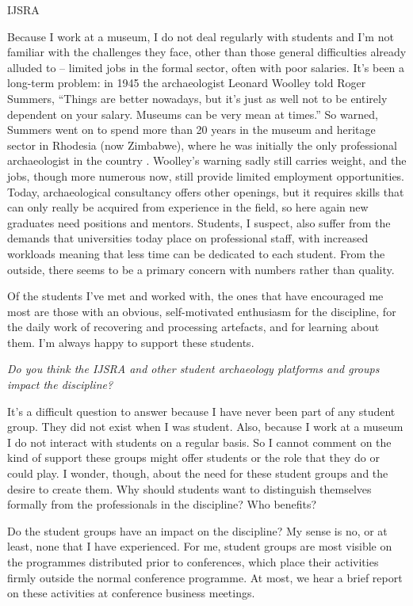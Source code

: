 \begin{labeling}{IJSRA}
\item[GW]
Because I work at a museum, I do not deal regularly with students and I’m not familiar with the challenges they face, other than those general difficulties already alluded to – limited jobs in the formal sector, often with poor salaries. It’s been a long-term problem: in 1945 the archaeologist Leonard Woolley told Roger Summers, “Things are better nowadays, but it’s just as well not to be entirely dependent on your salary. Museums can be very mean at times.” So warned, Summers went on to spend more than 20 years in the museum and heritage sector in Rhodesia (now Zimbabwe), where he was initially the only professional archaeologist in the country \parencite{Summers1995}. 
Woolley’s warning sadly still carries weight, and the jobs, though more numerous now, still provide limited employment opportunities. Today, archaeological consultancy offers other openings, but it requires skills that can only really be acquired from experience in the field, so here again new graduates need positions and mentors. Students, I suspect, also suffer from the demands that universities today place on professional staff, with increased workloads meaning that less time can be dedicated to each student. From the outside, there seems to be a primary concern with numbers rather than quality.

Of the students I’ve met and worked with, the ones that have encouraged me most are those with an obvious, self-motivated enthusiasm for the discipline, for the daily work of recovering and processing artefacts, and for learning about them. I’m always happy to support these students.


\item[IJSRA] \emph{Do you think the IJSRA and other student archaeology platforms and groups impact the discipline?}
	
\item[GW]
It’s a difficult question to answer because I have never been part of any student group. They did not exist when I was student. Also, because I work at a museum I do not interact with students on a regular basis. So I cannot comment on the kind of support these groups might offer students or the role that they do or could play. I wonder, though, about the need for these student groups and the desire to create them. Why should students want to distinguish themselves formally from the professionals in the discipline? Who benefits?

Do the student groups have an impact on the discipline? My sense is no, or at least, none that I have experienced. For me, student groups are most visible on the programmes distributed prior to conferences, which place their activities firmly outside the normal conference programme. At most, we hear a brief report on these activities at conference business meetings.

\end{labeling}

